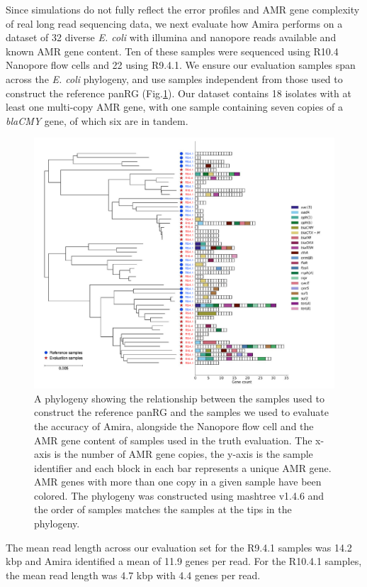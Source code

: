 Since simulations do not fully reflect the error profiles and AMR gene complexity of real long read sequencing data, we next evaluate how Amira performs on a dataset of 32 diverse \textit{E. coli} with illumina and nanopore reads available and known AMR gene content. Ten of these samples were sequenced using R10.4 Nanopore flow cells and 22 using R9.4.1. We ensure our evaluation samples span across the \textit{E. coli} phylogeny, and use samples independent from those used to construct the reference panRG (Fig.\ref{fig:3}). Our dataset contains 18 isolates with at least one multi-copy AMR gene, with one sample containing seven copies of a \textit{blaCMY} gene, of which six are in tandem. 

\begin{figure}
\centering
\includegraphics[width=1\linewidth]{Figures/figure_3.pdf}
\caption{A phylogeny showing the relationship between the samples used to construct the reference panRG and the samples we used to evaluate the accuracy of Amira, alongside the Nanopore flow cell and the AMR gene content of samples used in the truth evaluation. The x-axis is the number of AMR gene copies, the y-axis is the sample identifier and each block in each bar represents a unique AMR gene. AMR genes with more than one copy in a given sample have been colored. The phylogeny was constructed using mashtree v1.4.6 and the order of samples matches the samples at the tips in the phylogeny.}
\label{fig:3}
\end{figure}

The mean read length across our evaluation set for the R9.4.1 samples was 14.2 kbp and Amira identified a mean of 11.9 genes per read. For the R10.4.1 samples, the mean read length was 4.7 kbp with 4.4 genes per read.

